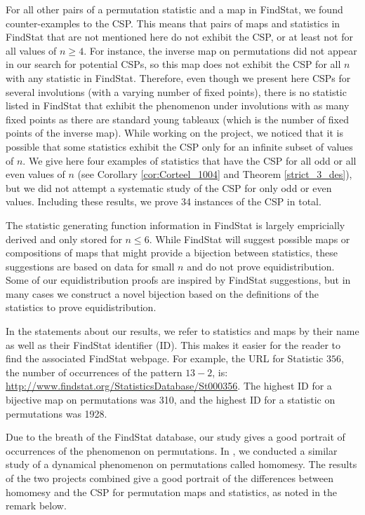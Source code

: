 \documentclass{amsart}
\theoremstyle{definition}
\newcommand{\Findstat}{{FindStat}\xspace}
\begin{document}
For all other pairs of a permutation statistic and a map in FindStat, we found counter-examples to the CSP. This means that pairs of maps and statistics in FindStat that are not mentioned here do not exhibit the CSP, or at least not for all values of $n \geq 4$. For instance, the inverse map on permutations did not appear in our search for potential CSPs, so this map does not exhibit the CSP for all $n$ with any statistic in FindStat. Therefore, even though we present here CSPs for several involutions (with a varying number of fixed points), there is no statistic listed in FindStat that exhibit the phenomenon under involutions with as many fixed points as there are standard young tableaux (which is the number of fixed points of the inverse map). While working on the project, we noticed that it is possible that some statistics exhibit the CSP only for an infinite subset of values of $n$. We give here four examples of statistics that have the CSP for all odd or all even values of $n$ (see Corollary \ref{cor:Corteel_1004} and Theorem \ref{strict_3_des}), but we did not attempt a systematic study of the CSP for only odd or even values. Including these results, we prove 34 instances of the CSP in total.

The statistic generating function information in FindStat is largely empricially derived and only stored for $n\leq 6.$ While FindStat will suggest possible maps or compositions of maps that might provide a bijection between statistics, these suggestions are based on data for small $n$ and do not prove equidistribution.  Some of our equidistribution proofs are inspired by FindStat suggestions, but in many cases we construct a novel bijection based on the definitions of the statistics to prove equidistribution. 

In the statements about our results, we refer to statistics and maps by their name as well as their \Findstat identifier (ID).  This makes it easier for the reader to find the associated \Findstat webpage.  For example, the URL for Statistic $356$, the number of occurrences of the pattern $13-2$, is: \url{http://www.findstat.org/StatisticsDatabase/St000356}. The highest ID for a bijective map on permutations was 310, and the highest ID for a statistic on permutations was 1928.

Due to the breath of the FindStat database, our study gives a good portrait of occurrences of the phenomenon on permutations.  In \cite{ELMSW22}, we conducted a similar study of a dynamical phenomenon on permutations called homomesy.  The results of the two projects combined give a good portrait of the differences between homomesy and the CSP for permutation maps and statistics, as noted in the remark below.
\end{document}

